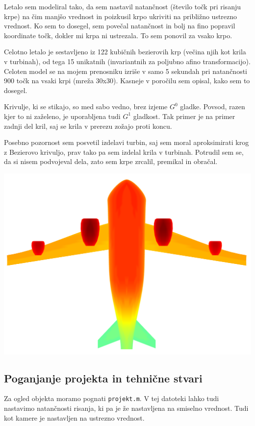 \documentclass[a4paper,11pt]{article}
\begin{document}
	Letalo sem modeliral tako, da sem nastavil natančnost (število točk pri risanju krpe) na čim manjšo vrednost in poizkusil krpo ukriviti na približno ustrezno vrednost. Ko sem to dosegel, sem povečal natančnost in bolj na fino popravil koordinate točk, dokler mi krpa ni ustrezala. To sem ponovil za vsako krpo.
	
	Celotno letalo je sestavljeno iz 122 kubičnih bezierovih krp (večina njih kot krila v turbinah), od tega 15 unikatnih (invariantnih za poljubno afino transformacijo). Celoten model se na mojem prenosniku izriše v samo 5 sekundah pri natančnosti 900 točk na vsaki krpi (mreža 30x30). Kasneje v poročilu sem opisal, kako sem to dosegel.
	
	Krivulje, ki se stikajo, so med sabo vedno, brez izjeme $G^0$ gladke. Povsod, razen kjer to ni zaželeno, je uporabljena tudi $G^1$ gladkost. Tak primer je na primer zadnji del kril, saj se krila v prerezu zožajo proti koncu.
	
	Posebno pozornost sem posvetil izdelavi turbin, saj sem moral aproksimirati krog z Bezierovo krivuljo, prav tako pa sem izdelal krila v turbinah. Potrudil sem se, da si nisem podvojeval dela, zato sem krpe zrcalil, premikal in obračal.
	
	\includegraphics[scale=0.35]{spodaj}
		
	\subsection{Poganjanje projekta in tehnične stvari}
	
	Za ogled objekta moramo pognati \texttt{projekt.m}. V tej datoteki lahko tudi nastavimo natančnosti risanja, ki pa je že nastavljena na smiselno vrednost. Tudi kot kamere je nastavljen na ustrezno vrednost.
		
\end{document}
